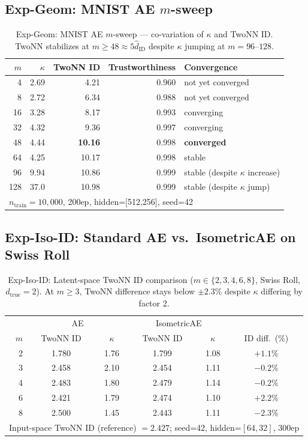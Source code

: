 \documentclass[11pt,a4paper]{jsarticle}
\newcommand{\kap}{\kappa}
\begin{document}
\subsection*{Exp-Geom: MNIST AE $m$-sweep}

\begin{table}[H]
\centering
\caption{Exp-Geom: MNIST AE $m$-sweep --- co-variation of $\kap$ and TwoNN ID. TwoNN stabilizes at $m \geq 48 \approx 5\hat{d}_\mathrm{ID}$ despite $\kap$ jumping at $m=96$--$128$.}
\label{tab:eq_mnist}
\small
\begin{tabular}{rrrrl}
\toprule
$m$ & $\kap$ & TwoNN ID & Trustworthiness & Convergence \\
\midrule
 4  & 2.69 & 4.21 & 0.960 & not yet converged \\
 8  & 2.72 & 6.34 & 0.988 & not yet converged \\
16  & 3.28 & 8.17 & 0.993 & converging \\
32  & 4.32 & 9.36 & 0.997 & converging \\
48  & 4.44 & \textbf{10.16} & 0.998 & \textbf{converged} \\
64  & 4.25 & 10.17 & 0.998 & stable \\
96  & 9.94 & 10.86 & 0.999 & stable (despite $\kap$ increase) \\
128 & 37.0 & 10.98 & 0.999 & stable (despite $\kap$ jump) \\
\midrule
\multicolumn{5}{l}{$n_\mathrm{train}=10{,}000$, 200ep, hidden=[512,256], seed=42} \\
\bottomrule
\end{tabular}
\end{table}

\subsection*{Exp-Iso-ID: Standard AE vs.\ IsometricAE on Swiss Roll}

\begin{table}[H]
\centering
\caption{Exp-Iso-ID: Latent-space TwoNN ID comparison ($m \in \{2,3,4,6,8\}$, Swiss Roll, $d_\mathrm{true}=2$). At $m \geq 3$, TwoNN difference stays below $\pm2.3\%$ despite $\kap$ differing by factor 2.}
\label{tab:iso_id}
\small
\begin{tabular}{r cc | cc | c}
\toprule
 & \multicolumn{2}{c|}{AE} & \multicolumn{2}{c|}{IsometricAE} & \\
$m$ & TwoNN ID & $\kap$ & TwoNN ID & $\kap$ & ID diff.\ (\%) \\
\midrule
2 & 1.780 & 1.76 & 1.799 & 1.08 & $+1.1\%$ \\
3 & 2.458 & 2.10 & 2.454 & 1.11 & $-0.2\%$ \\
4 & 2.483 & 1.80 & 2.479 & 1.14 & $-0.2\%$ \\
6 & 2.421 & 1.79 & 2.474 & 1.10 & $+2.2\%$ \\
8 & 2.500 & 1.45 & 2.443 & 1.11 & $-2.3\%$ \\
\midrule
\multicolumn{6}{l}{Input-space TwoNN ID (reference) $= 2.427$; seed=42, hidden=$[64,32]$, 300ep} \\
\bottomrule
\end{tabular}
\end{table}
\end{document}

